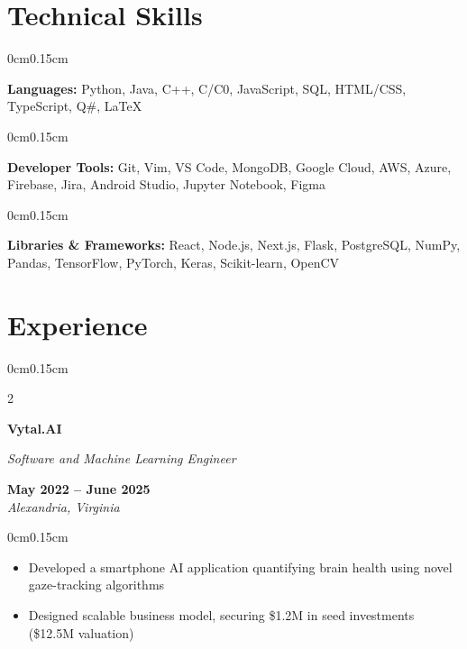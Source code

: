 \documentclass[10pt, letterpaper]{article}
\newenvironment{highlights}{
    \begin{itemize}[topsep=0pt, parsep=0pt, partopsep=0pt, itemsep=0pt, leftmargin=0.6cm]
}{
    \end{itemize}
}
\newenvironment{onecolentry}{
    \begin{adjustwidth}{0cm}{0.15cm}
}{
    \end{adjustwidth}
}
\newenvironment{twocolentry}[2][]{
    \onecolentry
    \def\secondColumn{#2}
    \setcolumnwidth{\fill, 4cm}
    \begin{paracol}{2}
}{
    \switchcolumn \raggedleft \secondColumn
    \end{paracol}
    \endonecolentry
}
\begin{document}
    \vspace{0.05cm}

    \section{Technical Skills}
    \vspace{0.1cm}

    \begin{onecolentry}
        \textbf{Languages:} Python, Java, C++, C/C0, JavaScript, SQL, HTML/CSS, TypeScript, Q\#, LaTeX
    \end{onecolentry}

    \begin{onecolentry}
        \textbf{Developer Tools:} Git, Vim, VS Code, MongoDB, Google Cloud, AWS, Azure, Firebase, Jira, Android Studio, Jupyter Notebook, Figma
    \end{onecolentry}

    \begin{onecolentry}
        \textbf{Libraries \& Frameworks:} React, Node.js, Next.js, Flask, PostgreSQL, NumPy, Pandas, TensorFlow, PyTorch, Keras, Scikit-learn, OpenCV
    \end{onecolentry}

    \vspace{0.05cm}
    \section{Experience}
    \vspace{0.1cm}

    \begin{twocolentry}{\textbf{May 2022 -- June 2025} \\ \textit{Alexandria, Virginia}}
        \textbf{Vytal.AI}
        
        \textit{Software and Machine Learning Engineer}
    \end{twocolentry}

    \begin{onecolentry}
        \begin{highlights}
            \item Developed a smartphone AI application quantifying brain health using novel gaze-tracking algorithms
            \item Designed scalable business model, securing \$1.2M in seed investments (\$12.5M valuation)
        \end{highlights}
    \end{onecolentry}
\end{document}
